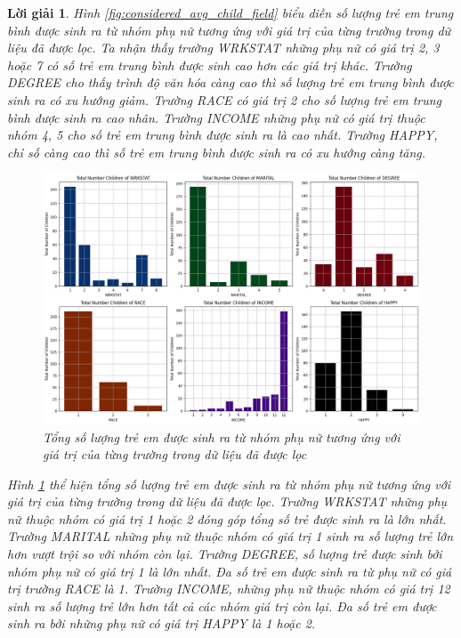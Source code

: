 \documentclass[14pt, a4paper]{article}
\theoremstyle{sltheorem}
\theoremstyle{soltheorem}
\newtheorem*{loigiai}{Lời giải}
\begin{document}
\begin{loigiai}
    Hình \ref{fig:considered_avg_child_field} biểu diễn số lượng trẻ em trung bình được sinh ra từ nhóm phụ nữ tương ứng với giá trị của từng trường trong dữ liệu đã được lọc.
    Ta nhận thấy trường WRKSTAT những phụ nữ có giá trị 2, 3 hoặc 7 có số trẻ em trung bình được sinh cao hơn các giá trị khác.
    Trường DEGREE cho thấy trình độ văn hóa càng cao thì số lượng trẻ em trung bình được sinh ra có xu hướng giảm.
    Trường RACE có giá trị 2 cho số lượng trẻ em trung bình được sinh ra cao nhân.
    Trường INCOME những phụ nữ có giá trị thuộc nhóm 4, 5 cho số trẻ em trung bình được sinh ra là cao nhất.
    Trường HAPPY, chỉ số càng cao thì số trẻ em trung bình được sinh ra có xu hướng càng tăng.

    \begin{figure}[H]
        \centering
        \includegraphics[width=0.8\linewidth]{figures/considered_total_child_field.png}
        \caption{Tổng số lượng trẻ em được sinh ra từ nhóm phụ nữ tương ứng với giá trị của từng trường trong dữ liệu đã được lọc}
        \label{fig:considered_total_child_field}
    \end{figure}

    Hình \ref{fig:considered_total_child_field} thể hiện tổng số lượng trẻ em được sinh ra từ nhóm phụ nữ tương ứng với giá trị của từng trường trong dữ liệu đã được lọc.
    Trường WRKSTAT những phụ nữ thuộc nhóm có giá trị 1 hoặc 2 đóng góp tổng số trẻ được sinh ra là lớn nhất.
    Trường MARITAL những phụ nữ thuộc nhóm có giá trị 1 sinh ra số lượng trẻ lớn hơn vượt trội so với nhóm còn lại.
    Trường DEGREE, số lượng trẻ được sinh bởi nhóm phụ nữ có giá trị 1 là lớn nhất.
    Đa số trẻ em được sinh ra từ phụ nữ có giá trị trường RACE là 1.
    Trường INCOME, những phụ nữ thuộc nhóm có giá trị 12 sinh ra số lượng trẻ lớn hơn tất cả các nhóm giá trị còn lại.
    Đa số trẻ em được sinh ra bởi những phụ nữ có giá trị HAPPY là 1 hoặc 2.


\end{loigiai}
\end{document}
